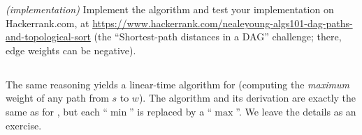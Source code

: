 
\exercise\emph{(implementation)}
Implement the algorithm and test your implementation on Hackerrank.com, at
\url{https://www.hackerrank.com/nealeyoung-algs101-dag-paths-and-topological-sort}
(the ``Shortest-path distances in a DAG'' challenge; there, edge weights can be negative).

\solution
{}

\subsection{}

The same reasoning yields a linear-time algorithm for 
(computing the \emph{maximum} weight of any path from $s$ to $w$).
The algorithm and its derivation are exactly the same as for ,
but each ``$\min$'' is replaced by a ``$\max$''.
We leave the details as an exercise. 





